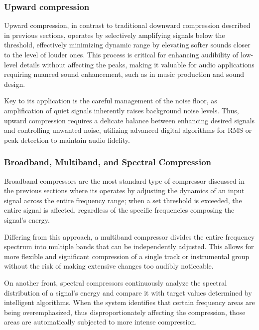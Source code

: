 \documentclass[10pt]{article}
\begin{document}
\begin{multicols*}{2}
                \subsubsection{Upward compression}
                    Upward compression, in contrast to traditional downward compression described in previous sections, operates by selectively amplifying signals below the threshold, effectively minimizing dynamic range by elevating softer sounds closer to the level of louder ones. This process is critical for enhancing audibility of low-level details without affecting the peaks, making it valuable for audio applications requiring nuanced sound enhancement, such as in music production and sound design.\par
                    Key to its application is the careful management of the noise floor, as amplification of quiet signals inherently raises background noise levels. Thus, upward compression requires a delicate balance between enhancing desired signals and controlling unwanted noise, utilizing advanced digital algorithms for RMS or peak detection to maintain audio fidelity.
        
                \subsubsection{Broadband, Multiband, and Spectral Compression}
                    Broadband compressors are the most standard type of compressor discussed in the previous sections where its operates by adjusting the dynamics of an input signal across the entire frequency range; when a set threshold is exceeded, the entire signal is affected, regardless of the specific frequencies composing the signal's energy.\par
                    Differing from this approach, a multiband compressor divides the entire frequency spectrum into multiple bands that can be independently adjusted. This allows for more flexible and significant compression of a single track or instrumental group without the risk of making extensive changes too audibly noticeable. \par
                    On another front, spectral compressors continuously analyze the spectral distribution of a signal's energy and compare it with target values determined by intelligent algorithms. When the system identifies that certain frequency areas are being overemphasized, thus disproportionately affecting the compression, those areas are automatically subjected to more intense compression.


\end{multicols*}
\end{document}
